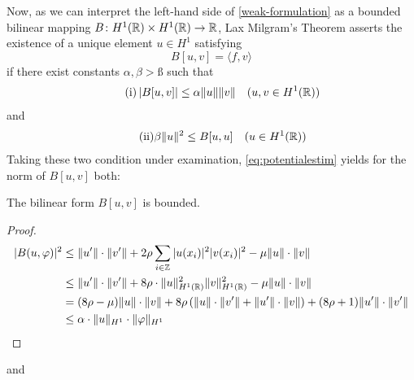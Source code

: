 Now, as we can interpret the left-hand side of \eqref{weak-formulation} as a bounded bilinear mapping $B \colon H^{1}(\mathbb{R}) \times H^{1}(\mathbb{R}) \rightarrow \mathbb{R}$, Lax Milgram's Theorem asserts the existence of a unique element $u \in H^{1}$ satisfying
\begin{equation*}
	B[u, v] = \langle f, v \rangle
\end{equation*}
if there exist constants $\alpha, \beta > ß$ such that
\leqnomode
\begin{align*}
	\tag{i} \left| B[u,v] \right| \leq \alpha \|u\| \|v\| \quad (u, v \in H^{1}(\mathbb{R}))
\end{align*}
and
\begin{align*}
	\tag{ii} \beta \|u\|^{2} \leq B[u, u] \quad (u \in H^{1}(\mathbb{R}))
\end{align*}
\reqnomode
Taking these two condition under examination, \eqref{eq:potentialestim} yields for the norm of $B[u, v]$ both:
\begin{theorem} \label{1.1}
	The bilinear form $B[u, v]$ is bounded.
	\begin{proof}
		\begin{align*}
			| B(u, \varphi)|^{2} & \leq \| u' \| \cdot \| v' \| + 2 \rho \sum_{i \in \mathbb{Z}} |u(x_{i})|^{2} |v(x_{i})|^{2} - \mu \| u \| \cdot \| v \| \\
				& \leq \| u' \| \cdot \| v' \| + 8 \rho \cdot \| u \|^{2}_{H^{1}(\mathbb{R})} \| v \|^{2}_{H^{1}(\mathbb{R})}  - \mu \| u \| \cdot \| v \| \\
				& = (8\rho - \mu) \| u \| \cdot \| v \| + 8\rho \left( \| u \| \cdot \| v' \| + \| u' \| \cdot \| v \| \right) + (8\rho + 1) \| u' \| \cdot \| v'\| \\
				& \leq \alpha \cdot \| u \|_{H^{1}} \cdot \| \varphi \|_{H^{1}}
		\end{align*}
	\end{proof}
\end{theorem}
and

